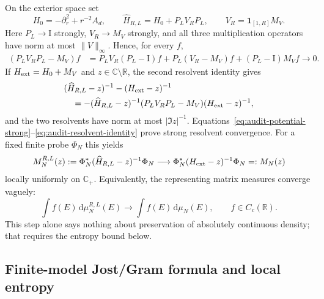 \documentclass[11pt]{article}
\newcommand{\R}{\mathbb R}
\newcommand{\C}{\mathbb C}
\newcommand{\Id}{\mathrm I}
\newcommand{\dd}{\,\mathrm d}
\theoremstyle{definition}
\theoremstyle{remark}
\begin{document}
On the exterior space set
\begin{equation}
 H_0=-\partial_r^2+r^{-2}A_d,
 \qquad
 \widehat H_{R,L}=H_0+P_LV_RP_L,
 \qquad
 V_R=\mathbf1_{[1,R]}M_V .
 \label{eq:audit-truncated-H}
\end{equation}
Here $P_L\to\Id$ strongly, $V_R\to M_V$ strongly, and all three multiplication operators have norm at most $\|V\|_\infty$.  Hence, for every $f$,
\begin{align}
 (P_LV_RP_L-M_V)f
 &=P_LV_R(P_L-\Id)f+P_L(V_R-M_V)f+(P_L-\Id)M_Vf
 \longrightarrow0.
 \label{eq:audit-potential-strong}
\end{align}
If $H_{\rm ext}=H_0+M_V$ and $z\in\C\setminus\R$, the second resolvent identity gives
\begin{align}
 &(\widehat H_{R,L}-z)^{-1}-(H_{\rm ext}-z)^{-1} \notag\\
 &\quad=-(\widehat H_{R,L}-z)^{-1}
 (P_LV_RP_L-M_V)(H_{\rm ext}-z)^{-1},
 \label{eq:audit-resolvent-identity}
\end{align}
and the two resolvents have norm at most $|\Im z|^{-1}$.  Equations~\eqref{eq:audit-potential-strong}--\eqref{eq:audit-resolvent-identity} prove strong resolvent convergence.  For a fixed finite probe $\Phi_N$ this yields
\begin{equation}
 M_N^{R,L}(z)
 :=\Phi_N^*(\widehat H_{R,L}-z)^{-1}\Phi_N
 \longrightarrow
 \Phi_N^*(H_{\rm ext}-z)^{-1}\Phi_N=:M_N(z)
 \label{eq:audit-herglotz-convergence}
\end{equation}
locally uniformly on $\C_+$.  Equivalently, the representing matrix measures converge vaguely:
\begin{equation}
 \int f(E)\dd\mu_N^{R,L}(E)
 \longrightarrow
 \int f(E)\dd\mu_N(E),
 \qquad f\in C_c(\R).
 \label{eq:audit-vague}
\end{equation}
This step alone says nothing about preservation of absolutely continuous density; that requires the entropy bound below.

\subsection{Finite-model Jost/Gram formula and local entropy}
\end{document}
